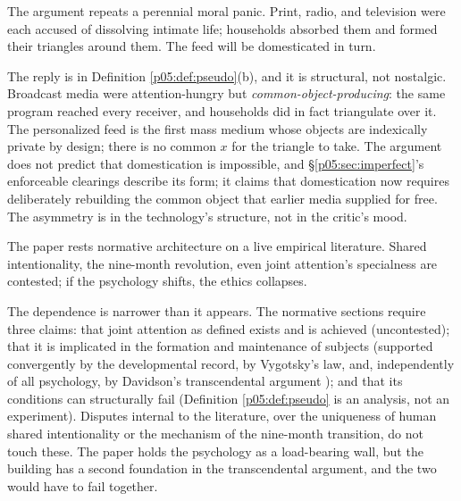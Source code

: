\begin{objection}
The argument repeats a perennial moral panic. Print, radio, and television were each accused of dissolving intimate life; households absorbed them and formed their triangles around them. The feed will be domesticated in turn.
\end{objection}
\begin{reply}
The reply is in Definition \ref{p05:def:pseudo}(b), and it is structural, not nostalgic. Broadcast media were attention-hungry but \emph{common-object-producing}: the same program reached every receiver, and households did in fact triangulate over it. The personalized feed is the first mass medium whose objects are indexically private by design; there is no common $x$ for the triangle to take. The argument does not predict that domestication is impossible, and §\ref{p05:sec:imperfect}'s enforceable clearings describe its form; it claims that domestication now requires deliberately rebuilding the common object that earlier media supplied for free. The asymmetry is in the technology's structure, not in the critic's mood.
\end{reply}

\begin{objection}
The paper rests normative architecture on a live empirical literature. Shared intentionality, the nine-month revolution, even joint attention's specialness are contested; if the psychology shifts, the ethics collapses.
\end{objection}
\begin{reply}
The dependence is narrower than it appears. The normative sections require three claims: that joint attention as defined exists and is achieved (uncontested); that it is implicated in the formation and maintenance of subjects (supported convergently by the developmental record, by Vygotsky's law, and, independently of all psychology, by Davidson's transcendental argument \parencite{davidson2001}); and that its conditions can structurally fail (Definition \ref{p05:def:pseudo} is an analysis, not an experiment). Disputes internal to the literature, over the uniqueness of human shared intentionality or the mechanism of the nine-month transition, do not touch these. The paper holds the psychology as a load-bearing wall, but the building has a second foundation in the transcendental argument, and the two would have to fail together.
\end{reply}

